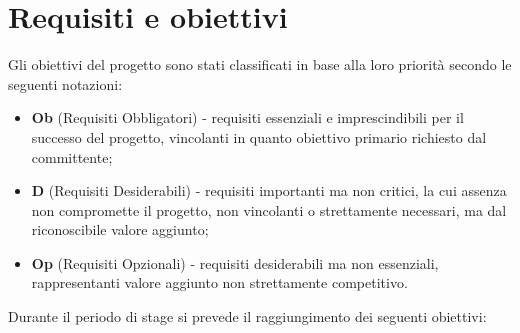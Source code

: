 \section{Requisiti e obiettivi}
Gli obiettivi del progetto sono stati classificati in base alla loro priorità secondo le seguenti notazioni:

\begin{itemize}
    \item \textbf{Ob} (Requisiti Obbligatori) - requisiti essenziali e imprescindibili per il successo del progetto, vincolanti in quanto obiettivo primario richiesto dal committente;
    \item \textbf{D} (Requisiti Desiderabili) - requisiti importanti ma non critici, la cui assenza non compromette il progetto, non vincolanti o strettamente necessari, ma dal riconoscibile valore aggiunto;
    \item \textbf{Op} (Requisiti Opzionali) - requisiti desiderabili ma non essenziali, rappresentanti valore aggiunto non strettamente competitivo.
\end{itemize}

\vspace{1em}

Durante il periodo di stage si prevede il raggiungimento dei seguenti obiettivi:

